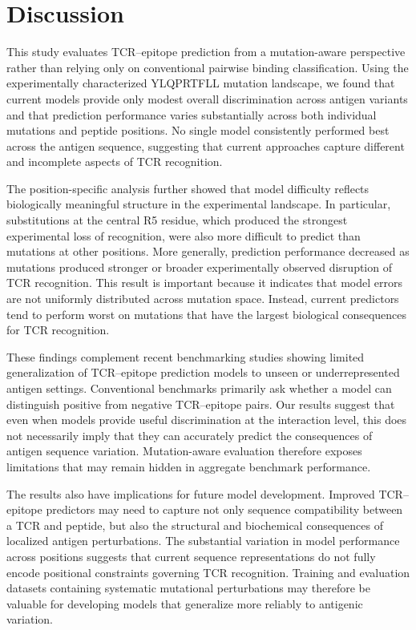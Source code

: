 \documentclass{article}
\begin{document}
\section{Discussion}

This study evaluates TCR--epitope prediction from a mutation-aware perspective rather than relying only on conventional pairwise binding classification. Using the experimentally characterized YLQPRTFLL mutation landscape, we found that current models provide only modest overall discrimination across antigen variants and that prediction performance varies substantially across both individual mutations and peptide positions. No single model consistently performed best across the antigen sequence, suggesting that current approaches capture different and incomplete aspects of TCR recognition.

The position-specific analysis further showed that model difficulty reflects biologically meaningful structure in the experimental landscape. In particular, substitutions at the central R5 residue, which produced the strongest experimental loss of recognition, were also more difficult to predict than mutations at other positions. More generally, prediction performance decreased as mutations produced stronger or broader experimentally observed disruption of TCR recognition. This result is important because it indicates that model errors are not uniformly distributed across mutation space. Instead, current predictors tend to perform worst on mutations that have the largest biological consequences for TCR recognition.

These findings complement recent benchmarking studies showing limited generalization of TCR--epitope prediction models to unseen or underrepresented antigen settings. Conventional benchmarks primarily ask whether a model can distinguish positive from negative TCR--epitope pairs. Our results suggest that even when models provide useful discrimination at the interaction level, this does not necessarily imply that they can accurately predict the consequences of antigen sequence variation. Mutation-aware evaluation therefore exposes limitations that may remain hidden in aggregate benchmark performance.

The results also have implications for future model development. Improved TCR--epitope predictors may need to capture not only sequence compatibility between a TCR and peptide, but also the structural and biochemical consequences of localized antigen perturbations. The substantial variation in model performance across positions suggests that current sequence representations do not fully encode positional constraints governing TCR recognition. Training and evaluation datasets containing systematic mutational perturbations may therefore be valuable for developing models that generalize more reliably to antigenic variation.
\end{document}
